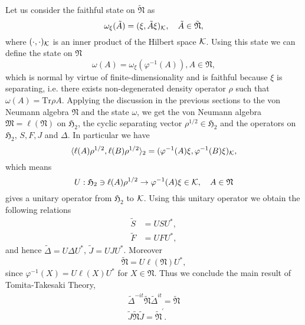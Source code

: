Let us consider the faithful state on $\tilde{\mathfrak{N}}$ as
$$
\omega_\xi(\tilde{A})=(\xi,\tilde{A}\xi)_{\cal K},\quad \tilde{A}\in \tilde{\mathfrak{N}},
$$
where $(\cdot,\cdot)_{\cal K}$ is an inner product of the Hilbert space ${\cal K}$.
Using this state we can define the state on $\mathfrak{N}$
$$
\omega(A)=\omega_\xi(\varphi^{-1}(A)),A\in \mathfrak{N},
$$
which is normal by virtue of finite-dimensionality and is faithful because $\xi$ is separating, i.e. there exists non-degenerated density operator $\rho$ such that $\omega(A)=\mbox{Tr}\rho A$.
Applying the discussion in the previous sections to the von Neumann algebra $\mathfrak{N}$ and the state
$\omega$, we get
the von Neumann algebra $\mathfrak{M}=\ell (\mathfrak{N})$ on  
$\mathfrak{H}_2$, the cyclic separating vector $\rho^{1/2}\in \mathfrak{H}_2$
and the operators on $\mathfrak{H}_2$, $S, F, J$ and $\Delta$.
In particular we have
$$
\langle \ell(A)\rho^{1/2},\ell( B)\rho^{1/2}\rangle_2=(\varphi^{-1}(A)\xi,\varphi^{-1}(B)\xi)_{\cal K},
$$
which means
$$
U:\mathfrak{H}_2\ni\ell(A)\rho^{1/2}\to \varphi^{-1}(A)\xi\in {\cal K}, \quad A\in \mathfrak{N}
$$
gives a unitary operator from $\mathfrak{H}_2$ to ${\cal K}$.
Using this unitary operator we obtain the following relations
\begin{equation}
\begin{split}
\tilde{S}&=US U^{\ast},\\
\tilde{F}&=UFU^\ast ,
\end{split}
\end{equation}
and hence $\tilde{\Delta}=U\Delta U^\ast$, $\tilde{J}=UJU^\ast$.
Moreover  
$$
\tilde{\mathfrak{N}}=U\ell(\mathfrak{N})U^\ast,
$$
since $\varphi^{-1}(X)=U\ell (X) U^\ast$ for $X\in \mathfrak{N}$.
Thus we conclude the main result of Tomita-Takesaki Theory,
\begin{equation}
\begin{split}
\tilde{\Delta}^{-it}\tilde{\mathfrak{N}}\tilde{\Delta}^{it}=\tilde{\mathfrak{N}}\\
\tilde{J}\tilde{\mathfrak{N}}\tilde{J}=\tilde{\mathfrak{N}}^\prime.
\end{split}
\end{equation}



